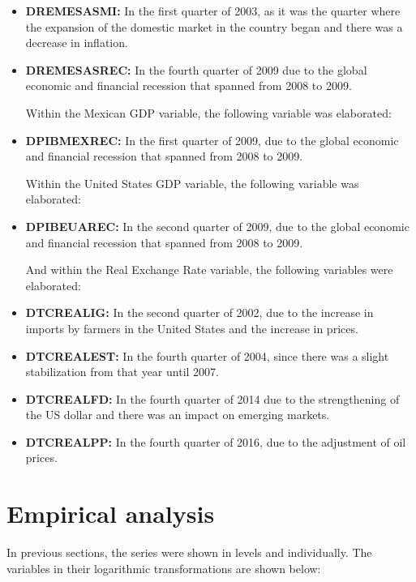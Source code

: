\documentclass[12pt,english, spanish]{smfart}
\begin{document}
\begin{itemize}
\item \textbf{DREMESASMI:} In the first quarter of 2003, as it was the quarter where the expansion of the domestic market in the country began and there was a decrease in inflation.\par
\item \textbf{DREMESASREC:} In the fourth quarter of 2009 due to the global economic and financial recession that spanned from 2008 to 2009.\par

 Within the Mexican GDP variable, the following variable was elaborated:\par
 
\item	\textbf{DPIBMEXREC:} In the first quarter of 2009, due to the global economic and financial recession that spanned from 2008 to 2009.\par

 Within the United States GDP variable, the following variable was elaborated:\par

\item \textbf{DPIBEUAREC:} In the second quarter of 2009, due to the global economic and financial recession that spanned from 2008 to 2009.\par

And within the Real Exchange Rate variable, the following variables were elaborated:\par

\item \textbf{DTCREALIG:} In the second quarter of 2002, due to the increase in imports by farmers in the United States and the increase in prices.\par
\item \textbf{DTCREALEST:} In the fourth quarter of 2004, since there was a slight stabilization from that year until 2007.\par
\item \textbf{DTCREALFD:} In the fourth quarter of 2014 due to the strengthening of the US dollar and there was an impact on emerging markets.\par
\item \textbf{DTCREALPP:} In the fourth quarter of 2016, due to the adjustment of oil prices.
 \end{itemize}

\section{Empirical analysis}
In previous sections, the series were shown in levels and individually. The variables in their logarithmic transformations are shown below:\par
\end{document}
